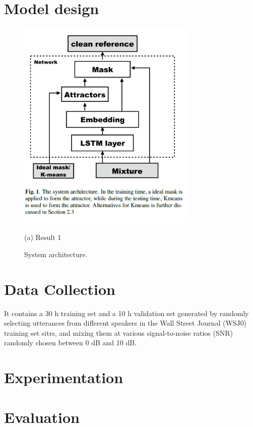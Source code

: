 \documentclass{article}
\begin{document}
\section{Model design}
\label{sec:format}
\begin{figure}[htb]

\begin{minipage}[b]{1.0\linewidth}
  \centering
  \centerline{\includegraphics[width=8.5cm]{Picture1.png}}
  \centerline{(a) Result 1}\medskip
\end{minipage}
%
\caption{System architecture.}
\label{fig:res}
%
\end{figure}


\section{Data Collection }
\label{sec:pagestyle}

It contains a 30 h training set and a 10 h validation set generated by randomly selecting utterances from
different speakers in the Wall Street Journal (WSJ0) training set sitrs, and mixing them at various signal-to-noise ratios (SNR) randomly chosen between 0 dB and 10 dB.

\section{Experimentation}
\label{sec:typestyle}



\section{Evaluation}
\label{sec:majhead}
\end{document}
